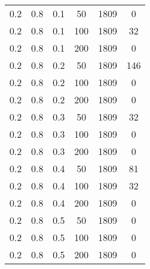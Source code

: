 \begin{table}[h]
\begin{center}
\begin{tabular}{|c|c|c|c|c|c|}
	   \hline
		0.2 &  0.8 &  0.1 &   50 &  1809 &     0 \\
		0.2 &  0.8 &  0.1 &  100 &  1809 &    32 \\
		0.2 &  0.8 &  0.1 &  200 &  1809 &     0 \\
	   \hline
		0.2 &  0.8 &  0.2 &   50 &  1809 &   146 \\
		0.2 &  0.8 &  0.2 &  100 &  1809 &     0 \\
		0.2 &  0.8 &  0.2 &  200 &  1809 &     0 \\
	   \hline
		0.2 &  0.8 &  0.3 &   50 &  1809 &    32 \\
		0.2 &  0.8 &  0.3 &  100 &  1809 &     0 \\
		0.2 &  0.8 &  0.3 &  200 &  1809 &     0 \\
	   \hline
		0.2 &  0.8 &  0.4 &   50 &  1809 &    81 \\
		0.2 &  0.8 &  0.4 &  100 &  1809 &    32 \\
		0.2 &  0.8 &  0.4 &  200 &  1809 &     0 \\
	   \hline
		0.2 &  0.8 &  0.5 &   50 &  1809 &     0 \\
		0.2 &  0.8 &  0.5 &  100 &  1809 &     0 \\
		0.2 &  0.8 &  0.5 &  200 &  1809 &     0 \\
	   \hline
    
    		\end{tabular}
	\end{center}
\end{table}
